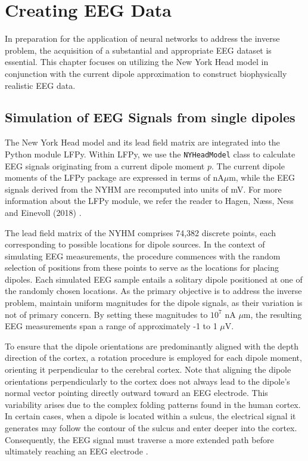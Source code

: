 \documentclass[a4paper, UKenglish, 11pt]{uiomaster}
\begin{document}
\chapter{Creating EEG Data}
In preparation for the application of neural networks to address the inverse problem, the acquisition of a substantial and appropriate EEG dataset is essential. This chapter focuses on utilizing the New York Head model in conjunction with the current dipole approximation to construct biophysically realistic EEG data.

\section{Simulation of EEG Signals from single dipoles}
The New York Head model and its lead field matrix are integrated into the Python module LFPy. Within LFPy, we use the \texttt{NYHeadModel} class to calculate EEG signals originating from a current dipole moment $p$. The current dipole moments of the LFPy package are expressed in terms of nA$\mu$m, while the EEG signals derived from the NYHM are recomputed into units of mV. For more information about the LFPy module, we refer the reader to Hagen, Næss, Ness and Einevoll (2018) \cite{LFPy}.

The lead field matrix of the NYHM comprises 74,382 discrete points, each corresponding to possible locations for dipole sources. In the context of simulating EEG measurements, the procedure commences with the random selection of positions from these points to serve as the locations for placing dipoles. Each simulated EEG sample entails a solitary dipole positioned at one of the randomly chosen locations. As the primary objective is to address the inverse problem, maintain uniform magnitudes for the dipole signals, as their variation is not of primary concern. By setting these magnitudes to $10^7$ nA $\mu$m, the resulting EEG measurements span a range of approximately -1 to 1 $\mu$V.

To ensure that the dipole orientations are predominantly aligned with the depth direction of the cortex, a rotation procedure is employed for each dipole moment, orienting it perpendicular to the cerebral cortex. Note that aligning the dipole orientations perpendicularly to the cortex does not always lead to the dipole's normal vector pointing directly outward toward an EEG electrode. This variability arises due to the complex folding patterns found in the human cortex. In certain cases, when a dipole is located within a sulcus, the electrical signal it generates may follow the contour of the sulcus and enter deeper into the cortex. Consequently, the EEG signal must traverse a more extended path before ultimately reaching an EEG electrode \cite{naess2021biophysically}.
\end{document}
